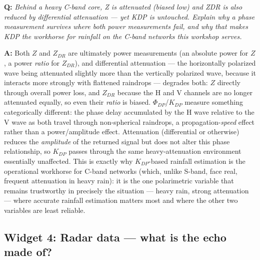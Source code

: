 \documentclass[11pt]{article}
\newenvironment{qa}[1]{\par\noindent\textbf{\color{qgray}Q: }\emph{#1}\par\noindent\textbf{A: }}{\par\vspace{6pt}}
\begin{document}
\begin{qa}{Behind a heavy C-band core, Z is attenuated (biased low) and ZDR is also reduced by \emph{differential} attenuation --- yet KDP is untouched. Explain why a phase measurement survives where both power measurements fail, and why that makes KDP the workhorse for rainfall on the C-band networks this workshop serves.}
Both $Z$ and $Z_{DR}$ are ultimately power measurements (an absolute power for $Z$, a power \emph{ratio} for $Z_{DR}$), and differential attenuation --- the horizontally polarized wave being attenuated slightly more than the vertically polarized wave, because it interacts more strongly with flattened raindrops --- degrades both: $Z$ directly through overall power loss, and $Z_{DR}$ because the H and V channels are no longer attenuated equally, so even their \emph{ratio} is biased. $\Phi_{DP}$/$K_{DP}$ measure something categorically different: the phase delay accumulated by the H wave relative to the V wave as both travel through non-spherical raindrops, a propagation-\emph{speed} effect rather than a power/amplitude effect. Attenuation (differential or otherwise) reduces the \emph{amplitude} of the returned signal but does not alter this phase relationship, so $K_{DP}$ passes through the same heavy-attenuation environment essentially unaffected. This is exactly why $K_{DP}$-based rainfall estimation is the operational workhorse for C-band networks (which, unlike S-band, face real, frequent attenuation in heavy rain): it is the one polarimetric variable that remains trustworthy in precisely the situation --- heavy rain, strong attenuation --- where accurate rainfall estimation matters most and where the other two variables are least reliable.
\end{qa}

\subsection{Widget 4: Radar data --- what is the echo made of?}
\end{document}
